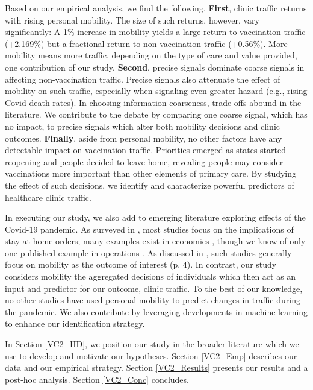  Based on our empirical analysis, we find the following. \textbf{First}, clinic traffic returns with rising personal mobility. The size of such returns, however, vary significantly: A 1\% increase in mobility yields a large return to vaccination traffic (+2.169\%) but a fractional return to non-vaccination traffic (+0.56\%). More mobility means more traffic, depending on the type of care and value provided, one contribution of our study. \textbf{Second}, precise signals dominate coarse signals in affecting non-vaccination traffic. Precise signals also attenuate the effect of mobility on such traffic, especially when signaling even greater hazard (e.g., rising Covid death rates). In choosing information coarseness, trade-offs abound in the literature. We contribute to the debate by comparing one coarse signal, which has no impact, to precise signals which alter both mobility decisions and clinic outcomes. \textbf{Finally}, aside from personal mobility, no other factors have any detectable impact on vaccination traffic. Priorities emerged as states started reopening and people decided to leave home, revealing people may consider vaccinations more important than other elements of primary care. By studying the effect of such decisions, we identify and characterize powerful predictors of healthcare clinic traffic.

 In executing our study, we also add to emerging literature exploring effects of the Covid-19 pandemic. As surveyed in \cite{Gupta2020a}, most studies focus on the implications of stay-at-home orders; many examples exist in economics \citep[e.g.,][]{Goolsbee2020_key,Goolsbee2020_unpub,Alfaro2020,Cantor2020,Alfaro2021,Ziedan2020,Farboodi2020,Zhang2020}, though we know of only one published example in operations \citep{Wang2021}. As discussed in \cite{Wang2021}, such studies generally focus on mobility as the outcome of interest (p. 4). In contrast, our study considers mobility the aggregated decisions of individuals which then act as an input and predictor for our outcome, clinic traffic. To the best of our knowledge, no other studies have used personal mobility to predict changes in traffic during the pandemic. We also contribute by leveraging developments in machine learning to enhance our identification strategy.
 
 In Section \ref{VC2_HD}, we position our study in the broader literature which we use to develop and motivate our hypotheses. Section \ref{VC2_Emp} describes our data and our empirical strategy. Section \ref{VC2_Results} presents our results and a post-hoc analysis. Section \ref{VC2_Conc} concludes.
 

